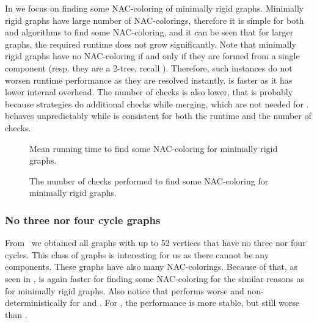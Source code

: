 In 
we focus on finding some NAC-coloring of minimally rigid graphs.
%
Minimally rigid graphs have large number of NAC-colorings,
therefore it is simple for both \NaiveCycles{}
and \Subgraphs{} algorithms to find some NAC-coloring,
and it can be seen that for larger graphs, the required runtime
does not grow significantly.
%
Note that minimally rigid graphs have no NAC-coloring if and only if they are formed from
a single \trcon{} component (resp. they are a 2-tree, recall ).
Therefore, such instances do not worsen runtime performance as they are resolved instantly.
%
\NaiveCycles{} is faster as it has lower internal overhead.
The number of \IsNACColoring{} checks is also lower,
that is probably because \Subgraphs{} strategies do additional checks
while merging, which are not needed for \NaiveCycles{}.
\SharedVertices{} behaves unpredictably while \MergeLinear{} is consistent
for both the runtime and the number of \IsNACColoring{} checks.

\begin{figure}[thbp]
	\centering
	\scalebox{\BenchFigureScale}{}
	\caption[Mean runtime for minimally rigid graphs (some)]{
		Mean running time to find some NAC-coloring for minimally rigid graphs.}%
	\label{fig:graph_minimally_rigid_first_runtime}
\end{figure}%
\begin{figure}[thbp]
	\centering
	\scalebox{\BenchFigureScale}{}
	\caption[Checks performed for minimally rigid graphs (some)]{
		The number of checks performed to find some NAC-coloring for minimally rigid graphs.}%
	\label{fig:graph_minimally_rigid_first_checks}
\end{figure}%



\subsubsection*{No three nor four cycle graphs}

From~\cite{extremal_graphs} we obtained all graphs with up to 52 vertices
that have no three nor four cycles. This class of graphs is interesting for us
as there cannot be any \trcon{} components.
These graphs have also many NAC-colorings.
Because of that, as seen in ,
\NaiveCycles{} is again faster for finding some NAC-coloring
for the similar reasons as for minimally rigid graphs.
%
Also notice that \SharedVertices{} performs worse and non-deterministically
for \CyclesMatchChunks{} and \None{}.
For \Neighbors{}, the performance is more stable, but still worse than \MergeLinear{}.

